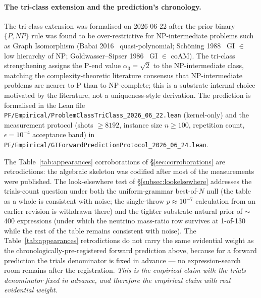 \documentclass[11pt,a4paper]{amsart}
\theoremstyle{plain}
\theoremstyle{definition}
\begin{document}
\paragraph{The tri-class extension and the prediction's chronology.} The tri-class extension was formalised on 2026-06-22 after the prior binary $\{P, NP\}$ rule was found to be over-restrictive for NP-intermediate problems such as Graph Isomorphism (Babai 2016~\cite{babai2016} quasi-polynomial; Sch\"oning 1988~\cite{schoning1988} GI $\in$ low hierarchy of NP; Goldwasser--Sipser 1986~\cite{goldwasser1986} GI $\in$ coAM). The tri-class strengthening assigns the P-end value $\alpha_3 = \sqrt{2}$ to the NP-intermediate class, matching the complexity-theoretic literature consensus that NP-intermediate problems are nearer to P than to NP-complete; this is a substrate-internal choice motivated by the literature, not a uniqueness-style derivation. The prediction is formalised in the Lean file \texttt{PF/Empirical/ProblemClassTriClass\_2026\_06\_22.lean} (kernel-only) and the measurement protocol (shots $\geq 8192$, instance size $n \geq 100$, repetition count, $\epsilon = 10^{-4}$ acceptance band) in \texttt{PF/Empirical/GIForwardPredictionProtocol\_2026\_06\_24.lean}.

The Table~\ref{tab:appearances} corroborations of \S\ref{sec:corroborations} are retrodictions: the algebraic skeleton was codified after most of the measurements were published. The look-elsewhere test of \S\ref{subsec:lookelsewhere} addresses the trials-count question under both the uniform-grammar best-of-$N$ null (the table as a whole is consistent with noise; the single-throw $p \approx 10^{-7}$ calculation from an earlier revision is withdrawn there) and the tighter substrate-natural prior of $\sim$\,400 expressions (under which the neutrino mass-ratio row survives at 1-of-130 while the rest of the table remains consistent with noise). The Table~\ref{tab:appearances} retrodictions do not carry the same evidential weight as the chronologically-pre-registered forward prediction above, because for a forward prediction the trials denominator is fixed in advance --- no expression-search room remains after the registration. \emph{This is the empirical claim with the trials denominator fixed in advance, and therefore the empirical claim with real evidential weight.}
\end{document}
